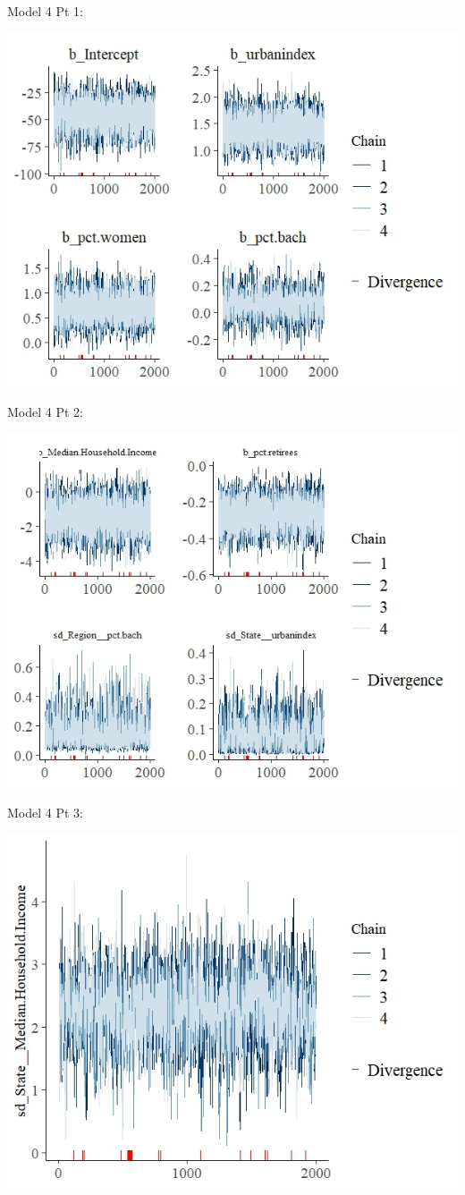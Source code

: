 \documentclass[12pt]{article}
\begin{document}
Model 4 Pt 1:

\includegraphics[scale = 1]{trace_plots/trace_model4_part1.jpeg}


Model 4 Pt 2: 

\includegraphics[scale = 1]{trace_plots/trace_model4_part2.jpeg}

Model 4 Pt 3: 

\includegraphics[scale = 1]{trace_plots/trace_model4_part3.jpeg}
\end{document}
